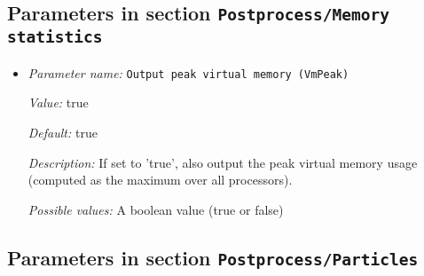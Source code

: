 \subsection{Parameters in section \tt Postprocess/Memory statistics}
\label{parameters:Postprocess/Memory_20statistics}

\begin{itemize}
\item {\it Parameter name:} {\tt Output peak virtual memory (VmPeak)}
\label{parameters:Postprocess/Memory statistics/Output peak virtual memory _28VmPeak_29}
\label{parameters:Postprocess/Memory_20statistics/Output_20peak_20virtual_20memory_20_28VmPeak_29}


{\it Value:} true


{\it Default:} true


{\it Description:} If set to 'true', also output the peak virtual memory usage (computed as the maximum over all processors).


{\it Possible values:} A boolean value (true or false)
\end{itemize}

\subsection{Parameters in section \tt Postprocess/Particles}
\label{parameters:Postprocess/Particles}

